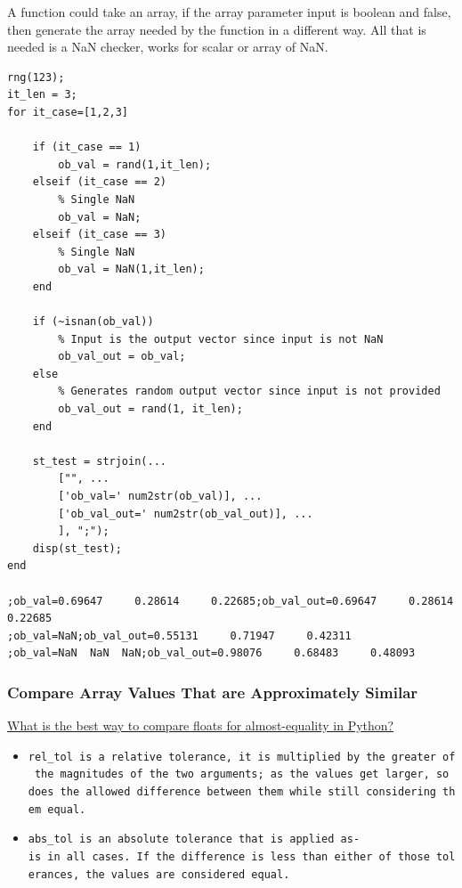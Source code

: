 \documentclass[
]{book}
\begin{document}
A function could take an array, if the array parameter input is boolean
and false, then generate the array needed by the function in a different
way. All that is needed is a NaN checker, works for scalar or array of
NaN.

\begin{verbatim}
rng(123);
it_len = 3;
for it_case=[1,2,3]
    
    if (it_case == 1)        
        ob_val = rand(1,it_len);
    elseif (it_case == 2)
        % Single NaN
        ob_val = NaN;
    elseif (it_case == 3)
        % Single NaN
        ob_val = NaN(1,it_len);
    end
    
    if (~isnan(ob_val))
        % Input is the output vector since input is not NaN
        ob_val_out = ob_val;
    else
        % Generates random output vector since input is not provided
        ob_val_out = rand(1, it_len);
    end

    st_test = strjoin(...
        ["", ...
        ['ob_val=' num2str(ob_val)], ...
        ['ob_val_out=' num2str(ob_val_out)], ...
        ], ";");
    disp(st_test);    
end

;ob_val=0.69647     0.28614     0.22685;ob_val_out=0.69647     0.28614     0.22685
;ob_val=NaN;ob_val_out=0.55131     0.71947     0.42311
;ob_val=NaN  NaN  NaN;ob_val_out=0.98076     0.68483     0.48093
\end{verbatim}

\hypertarget{compare-array-values-that-are-approximately-similar}{%
\subsubsection{Compare Array Values That are Approximately Similar}\label{compare-array-values-that-are-approximately-similar}}

\href{https://stackoverflow.com/a/33024979/8280804}{What is the best way to compare floats for almost-equality in
Python?}

\begin{itemize}
\item
  \texttt{rel\_tol\ is\ a\ relative\ tolerance,\ it\ is\ multiplied\ by\ the\ greater\ of\ the\ magnitudes\ of\ the\ two\ arguments;\ as\ the\ values\ get\ larger,\ so\ does\ the\ allowed\ difference\ between\ them\ while\ still\ considering\ them\ equal.}
\item
  \texttt{abs\_tol\ is\ an\ absolute\ tolerance\ that\ is\ applied\ as-is\ in\ all\ cases.\ If\ the\ difference\ is\ less\ than\ either\ of\ those\ tolerances,\ the\ values\ are\ considered\ equal.}
\end{itemize}
\end{document}
